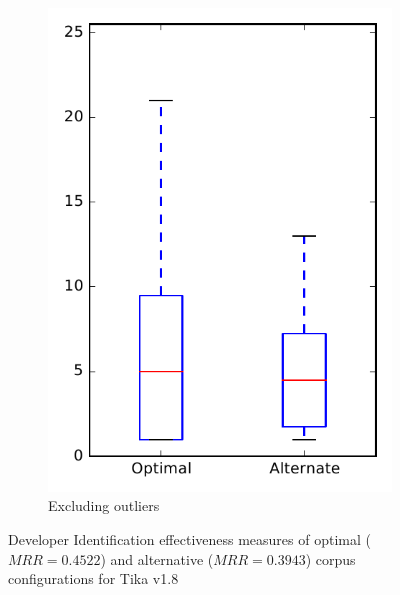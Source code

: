 \begin{figure}
\begin{subfigure}{.4\textwidth}
        \includegraphics[height=0.4\textheight]{figures/combo/dit_rq2_tika_no_outlier}
        \caption{Excluding outliers}\label{fig:combo:dit:rq2:tika_no_outlier}
    \end{subfigure}
\caption[Developer Identification effectiveness measures of optimal and alternative corpus configurations for Tika v1.8]%
{Developer Identification effectiveness measures of optimal ($MRR=0.4522$) and alternative ($MRR=0.3943$) corpus configurations for Tika v1.8}
\label{fig:combo:dit:rq2:tika}
\end{figure}
